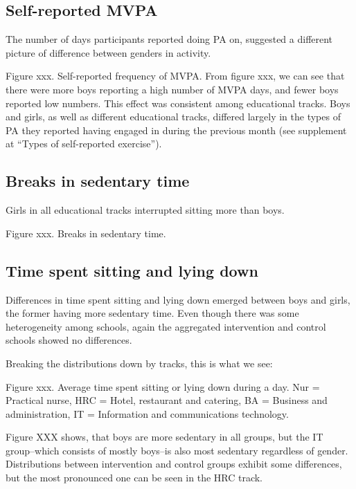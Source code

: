 \documentclass[english,floatsintext,]{apa6}
\theoremstyle{definition}
\theoremstyle{definition}
\theoremstyle{definition}
\theoremstyle{remark}
\begin{document}
\subsection{Self-reported MVPA}\label{self-reported-mvpa}

The number of days participants reported doing PA on, suggested a
different picture of difference between genders in activity.

Figure xxx. Self-reported frequency of MVPA. From figure xxx, we can see
that there were more boys reporting a high number of MVPA days, and
fewer boys reported low numbers. This effect was consistent among
educational tracks. Boys and girls, as well as different educational
tracks, differed largely in the types of PA they reported having engaged
in during the previous month (see supplement at \enquote{Types of
self-reported exercise}).

\subsection{Breaks in sedentary time}\label{breaks-in-sedentary-time}

Girls in all educational tracks interrupted sitting more than boys.

Figure xxx. Breaks in sedentary time.

\subsection{Time spent sitting and lying
down}\label{time-spent-sitting-and-lying-down}

Differences in time spent sitting and lying down emerged between boys
and girls, the former having more sedentary time. Even though there was
some heterogeneity among schools, again the aggregated intervention and
control schools showed no differences.

Breaking the distributions down by tracks, this is what we see:

Figure xxx. Average time spent sitting or lying down during a day. Nur =
Practical nurse, HRC = Hotel, restaurant and catering, BA = Business and
administration, IT = Information and communications technology.

Figure XXX shows, that boys are more sedentary in all groups, but the IT
group--which consists of mostly boys--is also most sedentary regardless
of gender. Distributions between intervention and control groups exhibit
some differences, but the most pronounced one can be seen in the HRC
track.
\end{document}
